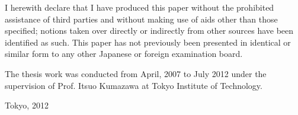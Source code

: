 


\begin{declaration}        %

I herewith declare that I have produced this paper without the prohibited assistance of third parties and without making use of aids other than those specified; notions taken over directly or indirectly from other sources have been identified as such. This paper has not previously been presented in identical or similar form to any other Japanese or foreign examination board.

The thesis work was conducted from April, 2007 to July 2012 under the supervision of Prof. Itsuo Kumazawa at Tokyo Institute of Technology.

\vspace{10mm}

Tokyo, 2012


\end{declaration}


